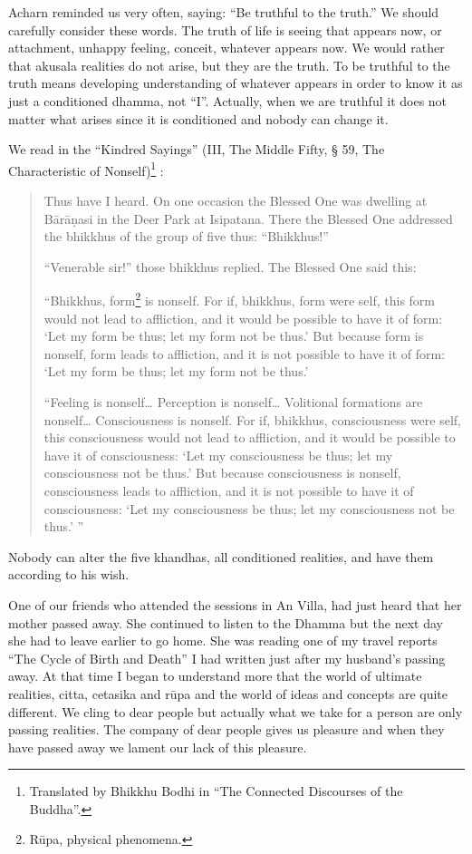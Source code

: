 Acharn reminded us very often, saying: ``Be truthful to the truth.'' We
should carefully consider these words. The truth of life is seeing that
appears now, or attachment, unhappy feeling, conceit, whatever appears
now. We would rather that akusala realities do not arise, but they are
the truth. To be truthful to the truth means developing understanding of
whatever appears in order to know it as just a conditioned dhamma, not
``I''. Actually, when we are truthful it does not matter what arises
since it is conditioned and nobody can change it.

We read in the ``Kindred Sayings'' (III, The Middle Fifty, § 59, The
Characteristic of
Nonself)\footnote{Translated by Bhikkhu
Bodhi in ``The Connected Discourses of the Buddha''.} :

\begin{quote}
Thus have I heard. On one occasion the Blessed One was dwelling at
Bārāṇasi in the Deer Park at Isipatana. There the Blessed One addressed
the bhikkhus of the group of five thus: ``Bhikkhus!''

``Venerable sir!'' those bhikkhus replied. The Blessed One said this:

``Bhikkhus, form\footnote{Rūpa, physical
phenomena.}  is
nonself. For if, bhikkhus, form were self, this form would not lead to
affliction, and it would be possible to have it of form: `Let my form be
thus; let my form not be thus.' But because form is nonself, form leads
to affliction, and it is not possible to have it of form: `Let my form
be thus; let my form not be thus.'

``Feeling is nonself\ldots{} Perception is nonself\ldots{} Volitional
formations are nonself\ldots{} Consciousness is nonself. For if,
bhikkhus, consciousness were self, this consciousness would not lead to
affliction, and it would be possible to have it of consciousness: `Let
my consciousness be thus; let my consciousness not be thus.' But because
consciousness is nonself, consciousness leads to affliction, and it is
not possible to have it of consciousness: `Let my consciousness be
thus; let my consciousness not be thus.' ''
\end{quote}

Nobody can alter the five khandhas, all conditioned realities, and have
them according to his wish.

One of our friends who attended the sessions in An Villa, had just heard
that her mother passed away. She continued to listen to the Dhamma but
the next day she had to leave earlier to go home. She was reading one of
my travel reports ``The Cycle of Birth and Death'' I had written just
after my husband's passing away. At that time I began to understand more
that the world of ultimate realities, citta, cetasika and rūpa and the
world of ideas and concepts are quite different. We cling to dear people
but actually what we take for a person are only passing realities. The
company of dear people gives us pleasure and when they have passed away
we lament our lack of this pleasure.

